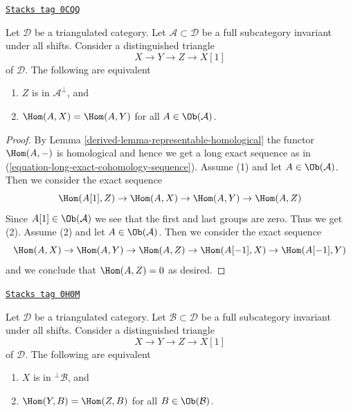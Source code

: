 \begin{lemma}
\label{derived-lemma-pre-prepare-adjoint}
\href{https://stacks.math.columbia.edu/tag/0CQQ}{\texttt{Stacks tag 0CQQ}}

Let $\mathcal{D}$ be a triangulated category.
Let $\mathcal{A} \subset \mathcal{D}$
be a full subcategory invariant under all shifts.
Consider a distinguished triangle
$$
X \to Y \to Z \to X[1]
$$
of $\mathcal{D}$. The following are equivalent
\begin{enumerate}
\item $Z$ is in $\mathcal{A}^\perp$, and
\item $\Hom(A, X) = \Hom(A, Y)$ for all $A \in \Ob(\mathcal{A})$.
\end{enumerate}
\end{lemma}

\begin{proof}

By Lemma \ref{derived-lemma-representable-homological} the functor
$\Hom(A, -)$ is homological and hence we get a long exact sequence
as in (\ref{equation-long-exact-cohomology-sequence}).
Assume (1) and let $A \in \Ob(\mathcal{A})$.
Then we consider the exact sequence
$$
\Hom(A[1], Z) \to \Hom(A, X) \to \Hom(A, Y) \to \Hom(A, Z)
$$
Since $A[1] \in \Ob(\mathcal{A})$
we see that the first and last groups are zero.
Thus we get (2). Assume (2) and let $A \in \Ob(\mathcal{A})$.
Then we consider the exact sequence
$$
\Hom(A, X) \to \Hom(A, Y) \to \Hom(A, Z) \to \Hom(A[-1], X) \to \Hom(A[-1], Y)
$$
and we conclude that $\Hom(A, Z) = 0$ as desired.
\end{proof}

\begin{lemma}
\label{derived-lemma-pre-prepare-adjoint-dual}
\href{https://stacks.math.columbia.edu/tag/0H0M}{\texttt{Stacks tag 0H0M}}

Let $\mathcal{D}$ be a triangulated category.
Let $\mathcal{B} \subset \mathcal{D}$
be a full subcategory invariant under all shifts.
Consider a distinguished triangle
$$
X \to Y \to Z \to X[1]
$$
of $\mathcal{D}$. The following are equivalent
\begin{enumerate}
\item $X$ is in ${}^\perp\mathcal{B}$, and
\item $\Hom(Y, B) = \Hom(Z, B)$ for all $B \in \Ob(\mathcal{B})$.
\end{enumerate}
\end{lemma}


